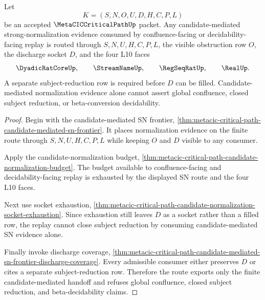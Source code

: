 \begin{theorem}
\label{thm:metacic-critical-path-candidate-mediated-sn-route}
Let
$$
K=(S,N,O,U,D,H,C,P,L)
$$
be an accepted $\MetaCICCriticalPathUp$ packet. Any candidate-mediated strong-normalization evidence consumed by confluence-facing or decidability-facing replay is routed through $S,N,U,H,C,P,L$, the visible obstruction row $O$, the discharge socket $D$, and the four L10 faces
$$
\DyadicRatCoreUp,\qquad
\StreamNameUp,\qquad
\RegSeqRatUp,\qquad
\RealUp .
$$
A separate subject-reduction row is required before $D$ can be filled. Candidate-mediated normalization evidence alone cannot assert global confluence, closed subject reduction, or beta-conversion decidability.
\end{theorem}
\begin{proof}
Begin with the candidate-mediated SN frontier, \autoref{thm:metacic-critical-path-candidate-mediated-sn-frontier}. It places normalization evidence on the finite route through $S,N,U,H,C,P,L$ while keeping $O$ and $D$ visible to any consumer.

Apply the candidate-normalization budget, \autoref{thm:metacic-critical-path-candidate-normalization-budget}. The budget available to confluence-facing and decidability-facing replay is exhausted by the displayed SN route and the four L10 faces.

Next use socket exhaustion, \autoref{thm:metacic-critical-path-candidate-normalization-socket-exhaustion}. Since exhaustion still leaves $D$ as a socket rather than a filled row, the replay cannot close subject reduction by consuming candidate-mediated SN evidence alone.

Finally invoke discharge coverage, \autoref{thm:metacic-critical-path-candidate-mediated-sn-frontier-discharge-coverage}. Every admissible consumer either preserves $D$ or cites a separate subject-reduction row. Therefore the route exports only the finite candidate-mediated handoff and refuses global confluence, closed subject reduction, and beta-decidability claims.
\end{proof}

